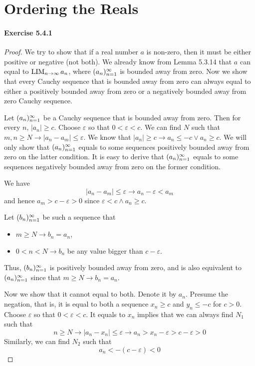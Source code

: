 \section{Ordering the Reals}
\paragraph{Exercise 5.4.1} \label{exercise5.4.1}
\begin{proof}
We try to show that if a real number $a$ is non-zero, then it must be either positive or negative (not both). We already know from 
Lemma 5.3.14 that $a$ can equal to $\operatorname*{LIM}_{n \to \infty}{a_n}$, where $(a_n)^\infty_{n=1}$ is bounded away from zero. Now we show that every Cauchy 
sequence that is bounded away from zero can always equal to either a positively bounded away from zero or a negatively bounded away 
from zero Cauchy sequence.

Let $(a_n)^\infty_{n=1}$ be a Cauchy sequence that is bounded away from zero. Then for every $n$, $|a_n| \geq c$. Choose $\varepsilon$ 
so that $0<\varepsilon<c$. We can find $N$ such that $m,n \geq N \longrightarrow |a_n-a_m| \leq \varepsilon$. We know that 
$|a_n| \geq c \longrightarrow a_n\leq -c \vee a_n \geq c$. We will only show that $(a_n)^\infty_{n=1}$ equals to some sequences 
positively bounded away from zero on the latter condition. It is easy to derive that $(a_n)^\infty_{n=1}$ equals to some sequences 
negatively bounded away from zero on the former condition.

We have
\[
|a_n-a_m| \leq \varepsilon \longrightarrow a_n -\varepsilon <a_m
\]
and hence $a_m >c-\varepsilon>0$ since $\varepsilon<c \wedge a_n \geq c$.

Let $(b_n)^\infty_{n=1}$ be such a sequence that
\begin{itemize}
\item $m \geq N \longrightarrow b_n = a_n$,
\item $0<n<N \longrightarrow b_n$ be any value bigger than $c-\varepsilon$.
\end{itemize}

Thus, $(b_n)^\infty_{n=1}$ is positively bounded away from zero, and is also equivalent to $(a_n)^\infty_{n=1}$ since that 
$m \geq N \longrightarrow b_n = a_n$.

Now we show that it cannot equal to both. Denote it by $a_n$. Presume the negation, that is, it is equal to both a sequence 
$x_n \geq c$ and $y_n \leq -c$ for $c>0$. Choose $\varepsilon$ so that $0<\varepsilon<c$. It equals to $x_n$ implies that we can always 
find $N_1$ such that 
\[
n \geq N \longrightarrow |a_n-x_n| \leq \varepsilon \longrightarrow a_n > x_n -\varepsilon >c-\varepsilon >0
\]
Similarly, we can find $N_2$ such that
\[
a_n < -(c-\varepsilon)<0
\]


\end{proof}
